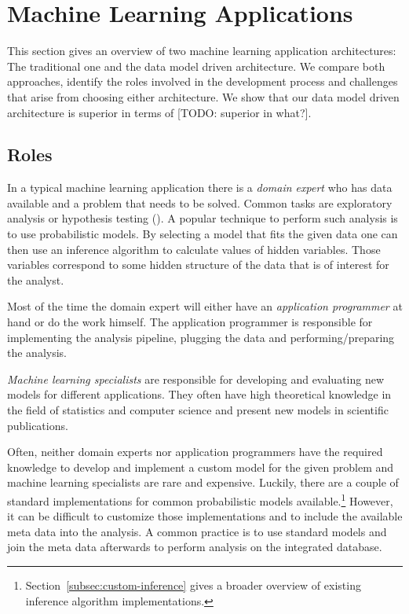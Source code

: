 \section{Machine Learning Applications}

This section gives an overview of two machine learning application architectures: The traditional one and the data model driven architecture. We compare both approaches, identify the roles involved in the development process and challenges that arise from choosing either architecture. We show that our data model driven architecture is superior in terms of [TODO: superior in what?].

\subsection{Roles}

In a typical machine learning application there is a \emph{domain expert} who has data available and a problem that needs to be solved. Common tasks are exploratory analysis or hypothesis testing (\cite{tukey1980we}). A popular technique to perform such analysis is to use probabilistic models. By selecting a model that fits the given data one can then use an inference algorithm to calculate values of hidden variables. Those variables correspond to some hidden structure of the data that is of interest for the analyst.

Most of the time the domain expert will either have an \emph{application programmer} at hand or do the work himself. The application programmer is responsible for implementing the analysis pipeline, plugging the data and performing/preparing the analysis.

\emph{Machine learning specialists} are responsible for developing and evaluating new models for different applications. They often have high theoretical knowledge in the field of statistics and computer science and present new models in scientific publications.

Often, neither domain experts nor application programmers have the required knowledge to develop and implement a custom model for the given problem and machine learning specialists are rare and expensive. Luckily, there are a couple of standard implementations for common probabilistic models available.\footnote{Section~\ref{subsec:custom-inference} gives a broader overview of existing inference algorithm implementations.} However, it can be difficult to customize those implementations and to include the available meta data into the analysis. A common practice is to use standard models and join the meta data afterwards to perform analysis on the integrated database.

